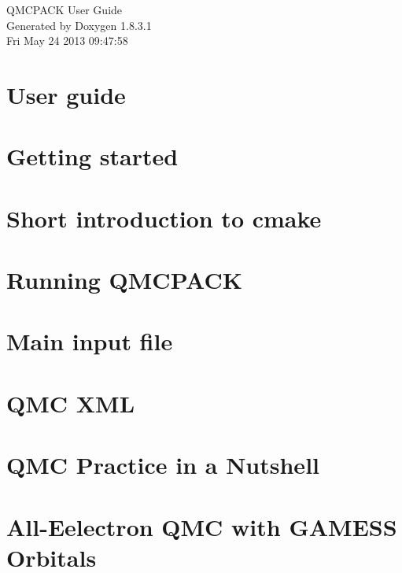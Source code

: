 \documentclass{book}
\begin{document}
\hypersetup{pageanchor=false,citecolor=blue}
\begin{titlepage}
\vspace*{7cm}
\begin{center}
{\Large QMCPACK User Guide}\\
\vspace*{1cm}
{\large Generated by Doxygen 1.8.3.1}\\
\vspace*{0.5cm}
{\small Fri May 24 2013 09:47:58}\\
\end{center}
\end{titlepage}
\clearemptydoublepage
{}
\tableofcontents
\clearemptydoublepage
{}
\hypersetup{pageanchor=true,citecolor=blue}
\chapter{User guide}
\label{index}
\chapter{Getting started}
\label{a00002}

\chapter{Short introduction to cmake}
\label{a00004}

\chapter{Running Q\-M\-C\-P\-A\-C\-K}
\label{a00006}

\chapter{Main input file}
\label{a00008}

\chapter{Q\-M\-C X\-M\-L}
\label{a00010}

\chapter{Q\-M\-C Practice in a Nutshell}
\label{a00012}

\chapter{All-\/\-Eelectron Q\-M\-C with G\-A\-M\-E\-S\-S Orbitals}
\label{a00014}

\printindex
\end{document}
